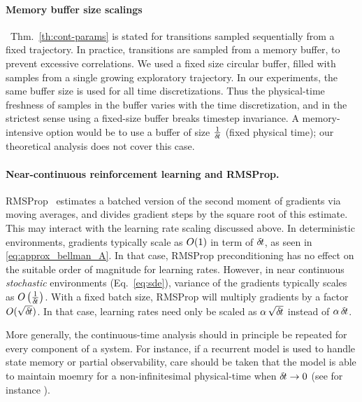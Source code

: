 \paragraph{Memory buffer size scalings}~Thm.~\ref{th:cont-params} is stated for
transitions sampled sequentially from a fixed trajectory. In practice,
transitions are sampled from a memory buffer, to prevent excessive correlations.
We used a fixed size circular buffer, filled
with samples from a single growing exploratory trajectory. In
our experiments, the same buffer size is used for all time discretizations. 
Thus the physical-time freshness of samples in the buffer varies with the
time discretization, and in the strictest sense using a fixed-size buffer
breaks timestep invariance. A memory-intensive option would be to use a
buffer of size $\frac{1}{{\delta\hspace{-.1em}t}}$ (fixed physical time); our theoretical
analysis does not cover this case.

\paragraph{Near-continuous reinforcement learning and RMSProp.} RMSProp~\cite{rmsprop}
estimates a batched version of the second moment of gradients via moving
averages, and divides gradient steps by the square root of this estimate.
This may interact with the learning rate scaling discussed above. In
deterministic environments, gradients typically scale as $O(1)$ in
term of ${\delta\hspace{-.1em}t}$, as seen in \eqref{eq:approx_bellman_A}.  In that case, RMSProp
preconditioning has no effect on the suitable order of magnitude for learning
rates. However, in near continuous \emph{stochastic} environments (Eq.~\ref{eq:sde}), variance of the gradients typically scales as
$O\left(\frac{1}{{\delta\hspace{-.1em}t}}\right)$. With a fixed batch size,
RMSProp will multiply gradients by a factor $O(\sqrt{{\delta\hspace{-.1em}t}})$. In
that case,
learning rates need only be scaled as $\alpha \,\sqrt{{\delta\hspace{-.1em}t}}$ instead of
$\alpha \,{\delta\hspace{-.1em}t}$.

More generally, the continuous-time analysis should in principle be repeated for every component of  
a system. For instance, if a recurrent model is used to handle state memory or partial observability, care should be taken that the model is able to maintain moemry for a non-infinitesimal physical-time when ${\delta\hspace{-.1em}t}\to 0$ (see for instance ).
